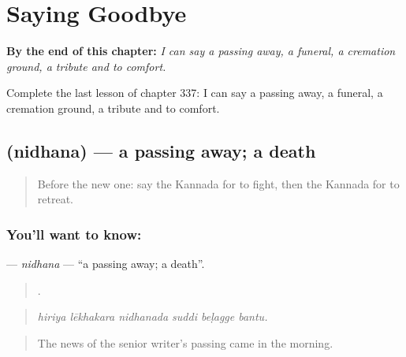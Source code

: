 
\chapter{Saying Goodbye}
\label{ch:ka-saying-goodbye}

\begin{chapteropening}
\textbf{By the end of this chapter:} \emph{I can say a passing away, a funeral, a cremation ground, a tribute and to comfort.}

Complete the last lesson of chapter 337: I can say a passing away, a funeral, a cremation ground, a tribute and to comfort.
\end{chapteropening}

\section[\texorpdfstring{\kn{ನಿಧನ} (nidhana)}{ನಿಧನ (nidhana)}]{ (nidhana) — a passing away; a death}

\label{lesson:KA-C337-nidhana}



\begin{quote}
Before the new one: say the Kannada for to fight, then the Kannada for to retreat.
\end{quote}

\subsection*{You'll want to know: }
\textbf{} — \emph{nidhana} — \textquotedblleft{}a passing away; a death\textquotedblright{}.

\begin{quote}
     .
\end{quote}

\begin{quote}
\emph{hiriya lēkhakara nidhanada suddi beḷagge bantu.}
\end{quote}

\begin{quote}
The news of the senior writer's passing came in the morning.
\end{quote}

